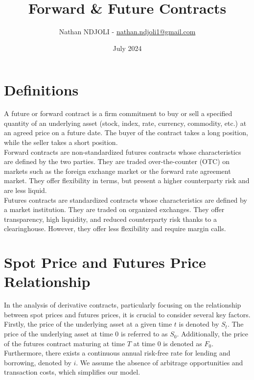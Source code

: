 \documentclass[a4paper,10pt]{article}
\title{Forward \& Future Contracts}
\author{Nathan NDJOLI - \href{mailto:nathan.ndjoli1@gmail.com}{nathan.ndjoli1@gmail.com}}
\date{July 2024}
\begin{document}
\maketitle

\section*{Definitions}

    \noindent A future or forward contract is a firm commitment to buy or sell a specified quantity of an underlying asset (stock, index, rate, currency, commodity, etc.) at an agreed price on a future date. The buyer of the contract takes a long position, while the seller takes a short position. \\
    
    \noindent Forward contracts are non-standardized futures contracts whose characteristics are defined by the two parties. They are traded over-the-counter (OTC) on markets such as the foreign exchange market or the forward rate agreement market. They offer flexibility in terms, but present a higher counterparty risk and are less liquid. \\
    
    \noindent Futures contracts are standardized contracts whose characteristics are defined by a market institution. They are traded on organized exchanges. They offer transparency, high liquidity, and reduced counterparty risk thanks to a clearinghouse. However, they offer less flexibility and require margin calls. \\

\section*{Spot Price and Futures Price Relationship}

    \noindent In the analysis of derivative contracts, particularly focusing on the relationship between spot prices and futures prices, it is crucial to consider several key factors. Firstly, the price of the underlying asset at a given time \( t \) is denoted by \( S_t \). The price of the underlying asset at time 0 is referred to as \( S_0 \). Additionally, the price of the futures contract maturing at time \( T \) at time 0 is denoted as \( F_0 \). Furthermore, there exists a continuous annual risk-free rate for lending and borrowing, denoted by \( i \). We assume the absence of arbitrage opportunities and transaction costs, which simplifies our model. \\
\end{document}
